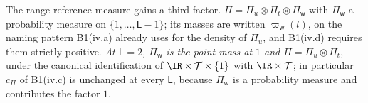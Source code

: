 %
%
%
%
The range reference measure gains a third factor. $\Pi=\Pi_u\otimes\Pi_t\otimes\Pi_{\mathsf w}$
with $\Pi_{\mathsf w}$ a probability measure on $\{1,\dots,\mathsf L-1\}$; its masses are written
$\varpi_{\mathsf w}(l)$, on the naming pattern B1(iv.a) already uses for the density of $\Pi_u$, and
B1(iv.d) requires them strictly positive. \emph{At $\mathsf L=2$, $\Pi_{\mathsf w}$ is the point mass at
$1$ and $\Pi=\Pi_u\otimes\Pi_t$}, under the canonical identification of $\IR\times\mathcal T\times\{1\}$
with $\IR\times\mathcal T$; in particular $c_\Pi$ of B1(iv.c) is unchanged at every $\mathsf L$, because
$\Pi_{\mathsf w}$ is a probability measure and contributes the factor $1$.

